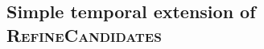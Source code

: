 \subsection{Simple temporal extension of \textsc{RefineCandidates}}
\label{sec:naive_refine_candidates}

